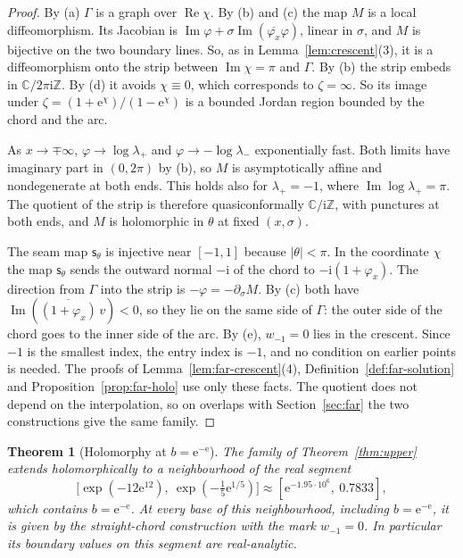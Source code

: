 \documentclass[11pt]{amsart}
\newtheorem{theorem}{Theorem}[section]
\theoremstyle{definition}
\newcommand{\eee}{\mathrm{e}}
\newcommand{\ii}{\mathrm{i}}
\begin{document}
\begin{proof}
By (a) $\Gamma$ is a graph over $\operatorname{Re}\chi$.  By (b) and (c) the map $M$ is a local
diffeomorphism.  Its Jacobian is $\operatorname{Im}\varphi+\sigma\operatorname{Im}(\overline{\varphi_x}\varphi)$, linear in $\sigma$, and $M$
is bijective on the two boundary lines.  So, as in Lemma~\ref{lem:crescent}(3), it is
a diffeomorphism onto the strip between $\operatorname{Im}\chi=\pi$ and $\Gamma$.  By (b) the strip embeds
in $\mathbb C/2\pi\ii\mathbb Z$.  By (d) it avoids $\chi\equiv0$, which corresponds to $\zeta=\infty$.  So its image
under $\zeta=(1+\eee^\chi)/(1-\eee^\chi)$ is a bounded Jordan region bounded by the chord and the arc.

As $x\to\mp\infty$, $\varphi\to\log\lambda_+$ and $\varphi\to-\log\lambda_-$ exponentially fast.  Both limits have
imaginary part in $(0,2\pi)$ by (b), so $M$ is asymptotically affine and nondegenerate at
both ends.  This holds also for $\lambda_+=-1$, where $\operatorname{Im}\log\lambda_+=\pi$.  The quotient of the
strip is therefore quasiconformally $\mathbb C/\ii\mathbb Z$, with punctures at both ends, and
$M$ is holomorphic in $\theta$ at fixed $(x,\sigma)$.

The seam map $\mathsf s_\theta$ is injective near $[-1,1]$ because $|\theta|<\pi$.  In the coordinate
$\chi$ the map $\mathsf s_\theta$ sends the outward normal $-\ii$ of the chord to $-\ii(1+\varphi_x)$.  The
direction from $\Gamma$ into the strip is $-\varphi=-\partial_\sigma M$.  By (c) both have
$\operatorname{Im}(\overline{(1+\varphi_x)}\,v)<0$, so they lie on the same side of $\Gamma$: the outer side of the
chord goes to the inner side of the arc.  By (e), $w_{-1}=0$ lies in the crescent.  Since $-1$
is the smallest index, the entry index is $-1$, and no condition on earlier points
is needed.  The proofs of
Lemma~\ref{lem:far-crescent}(4), Definition~\ref{def:far-solution} and
Proposition~\ref{prop:far-holo} use only these facts.  The quotient does not depend on
the interpolation, so on overlaps with Section~\ref{sec:far} the two constructions
give the same family.
\end{proof}

\begin{theorem}[Holomorphy at $b=\eee^{-\eee}$]\label{thm:endpoint}
The family of Theorem~\ref{thm:upper} extends holomorphically to a neighbourhood of
the real segment
\[
 \bigl[\exp(-12\eee^{12}),\ \exp(-\tfrac15\eee^{1/5})\bigr]\approx[\eee^{-1.95\cdot10^6},\ 0.7833],
\]
which contains $b=\eee^{-\eee}$.  At every base of this neighbourhood, including $b=\eee^{-\eee}$,
it is given by the straight-chord construction with the mark $w_{-1}=0$.  In
particular its boundary values on this segment are real-analytic.
\end{theorem}
\end{document}
